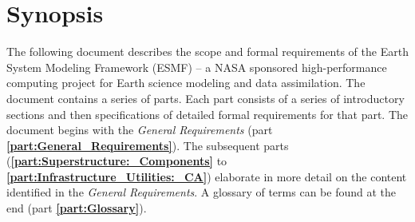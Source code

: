 \section{Synopsis}

The following document describes the scope and formal requirements
of the Earth System Modeling Framework (ESMF) -- a NASA sponsored 
high-performance computing project for Earth science modeling and 
data assimilation. The document contains a series of parts.
Each part consists of a series of introductory
sections and then specifications of detailed formal requirements
for that part. The document begins with the {\it General Requirements}
(part {\bf \ref{part:General_Requirements}}). The subsequent parts 
({\bf \ref{part:Superstructure:_Components}} to {\bf \ref{part:Infrastructure_Utilities:_CA}}) 
elaborate in more detail on the content identified in the {\it General Requirements}.
A glossary of terms can be found at the end (part {\bf \ref{part:Glossary}}).







